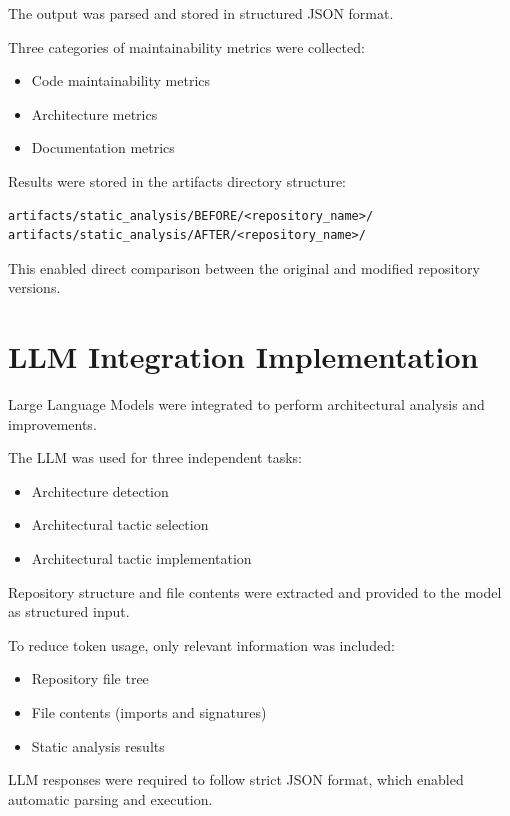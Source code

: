 The output was parsed and stored in structured JSON format.

Three categories of maintainability metrics were collected:

\begin{itemize}
\item Code maintainability metrics
\item Architecture metrics
\item Documentation metrics
\end{itemize}

Results were stored in the artifacts directory structure:

\begin{verbatim}
artifacts/static_analysis/BEFORE/<repository_name>/
artifacts/static_analysis/AFTER/<repository_name>/
\end{verbatim}

This enabled direct comparison between the original and modified repository versions.

\section{LLM Integration Implementation}

Large Language Models were integrated to perform architectural analysis and improvements.

The LLM was used for three independent tasks:

\begin{itemize}
\item Architecture detection
\item Architectural tactic selection
\item Architectural tactic implementation
\end{itemize}

Repository structure and file contents were extracted and provided to the model as structured input.

To reduce token usage, only relevant information was included:

\begin{itemize}
\item Repository file tree
\item File contents (imports and signatures)
\item Static analysis results
\end{itemize}

LLM responses were required to follow strict JSON format, which enabled automatic parsing and execution.

